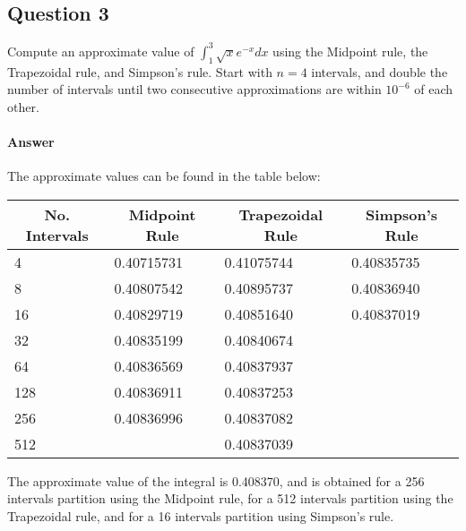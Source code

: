 \subsection{Question 3}
Compute an approximate value of $ \int_{1}^{3} \sqrt{x} e^{-x} dx $ using the
    Midpoint rule, the Trapezoidal rule, and Simpson's rule.
Start with $ n = 4 $ intervals, and double the number of intervals until two
    consecutive approximations are within $ 10^{-6} $ of each other.

\paragraph{Answer}
The approximate values can be found in the table below:
\begin{table}
    \center
    \begin{tabular}[c]{l|l|l|l}
        \hline
        \multicolumn{1}{c|}{No. Intervals} &
        \multicolumn{1}{c}{Midpoint Rule} &
        \multicolumn{1}{c}{Trapezoidal Rule} &
        \multicolumn{1}{c}{Simpson's Rule} \\
        \hline
        4   & 0.40715731 & 0.41075744 & 0.40835735 \\
        8   & 0.40807542 & 0.40895737 & 0.40836940 \\
        16  & 0.40829719 & 0.40851640 & 0.40837019 \\
        32  & 0.40835199 & 0.40840674 & \\
        64  & 0.40836569 & 0.40837937 & \\
        128 & 0.40836911 & 0.40837253 & \\
        256 & 0.40836996 & 0.40837082 & \\
        512 &            & 0.40837039 & \\
        \hline
    \end{tabular}
\end{table}
The approximate value of the integral is 0.408370, and is obtained for a 256
    intervals partition using the Midpoint rule, for a 512 intervals partition
    using the Trapezoidal rule, and for a 16 intervals partition using
    Simpson's rule.
